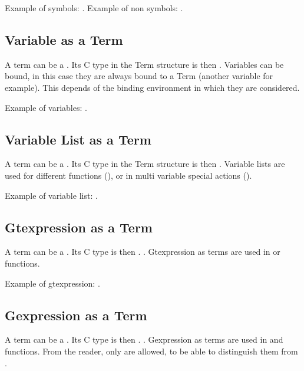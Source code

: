 Example of symbols: .\*
Example of non symbols: .

\subsection{Variable as a Term}

A term can be a . Its C type in the Term structure is then
. Variables can be bound, in this case they are always bound to
a Term (another variable for example). This depends of the binding environment
in which they are considered.

Example of variables: .

\subsection{Variable List as a Term}

A term can be a . Its C type in the Term structure is then
. Variable lists are used for different functions
(), or in 
multi variable special actions ().

Example of variable list: .

\subsection{Gtexpression as a Term}

A term can be a . Its C type is then .
. Gtexpression as terms are used in
 or  functions.

Example of gtexpression: .

\subsection{Gexpression as a Term}

A term can be a . Its C type is then .
. Gexpression as terms are used in  and
 functions.  From the reader, only  are allowed,
to be able to distinguish them from .

